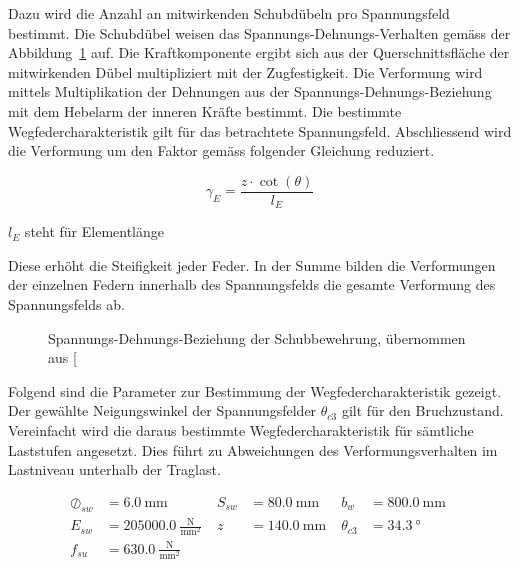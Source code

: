 \documentclass[
  11pt,
  letterpaper,
]{scrreprt}
\begin{document}
Dazu wird die Anzahl an mitwirkenden Schubdübeln pro Spannungsfeld
bestimmt. Die Schubdübel weisen das Spannungs-Dehnungs-Verhalten gemäss
der Abbildung~\ref{fig-sigma-eps-a3v2} auf. Die Kraftkomponente ergibt
sich aus der Querschnittsfläche der mitwirkenden Dübel multipliziert mit
der Zugfestigkeit. Die Verformung wird mittels Multiplikation der
Dehnungen aus der Spannungs-Dehnungs-Beziehung mit dem Hebelarm der
inneren Kräfte bestimmt. Die bestimmte Wegfedercharakteristik gilt für
das betrachtete Spannungsfeld. Abschliessend wird die Verformung um den
Faktor gemäss folgender Gleichung reduziert.

\[
\gamma_{E} = \frac{z \cdot \cot(\theta)}{l_{E}}
\]

\(l_{E}\) steht für Elementlänge

Diese erhöht die Steifigkeit jeder Feder. In der Summe bilden die
Verformungen der einzelnen Federn innerhalb des Spannungsfelds die
gesamte Verformung des Spannungsfelds ab.

\begin{figure}[H]


\caption{\label{fig-sigma-eps-a3v2}Spannungs-Dehnungs-Beziehung der
Schubbewehrung, übernommen aus
{[}\citeproc{ref-gitz_ansatze_2024}{1}{]}}

\end{figure}%

Folgend sind die Parameter zur Bestimmung der Wegfedercharakteristik
gezeigt. Der gewählte Neigungswinkel der Spannungsfelder \(\theta_{c3}\)
gilt für den Bruchzustand. Vereinfacht wird die daraus bestimmte
Wegfedercharakteristik für sämtliche Laststufen angesetzt. Dies führt zu
Abweichungen des Verformungsverhalten im Lastniveau unterhalb der
Traglast.

$$
\begin{aligned}
\oslash_{sw} &= 6.0\ \mathrm{mm} \; 
 &S_{sw} &= 80.0\ \mathrm{mm} \; 
 &b_{w} &= 800.0\ \mathrm{mm} \; 
\\[12pt]
 E_{sw} &= 205000.0\ \frac{\mathrm{N}}{\mathrm{mm}^{2}} \; 
 &z &= 140.0\ \mathrm{mm} \; 
 &\theta_{c3} &= 34.3\ \mathrm{°} \; 
\\[12pt]
 f_{su} &= 630.0\ \frac{\mathrm{N}}{\mathrm{mm}^{2}} \;
\end{aligned}
$$
\end{document}
